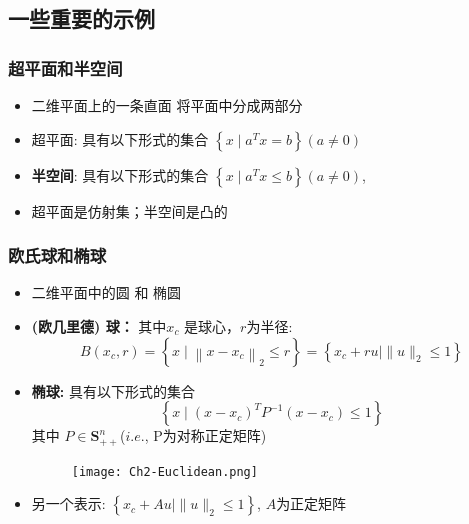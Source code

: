 \documentclass[handout]{beamer}
\begin{document}
\subsection{一些重要的示例}
\begin{frame}
\frametitle{超平面和半空间}

\begin{itemize}%
	\item<1-> 二维平面上的一条直面 将平面中分成两部分 
\item<2->
超平面: 具有以下形式的集合 $\left\{x \mid a^{T} x=b\right\}(a \neq 0)$



\item<2->
\textbf{半空间}: 具有以下形式的集合 $\left\{x \mid a^{T} x \leq b\right\} (a \neq 0)$,



 \item<3-> 超平面是仿射集；半空间是凸的


\end{itemize}

\end{frame}
\begin{frame}
\frametitle{欧氏球和椭球}

\begin{itemize}[<+->]
	\item 二维平面中的圆 和 椭圆 
  \item
\textbf{(欧几里德) 球：} 其中$x_c$ 是球心，$r$为半径:
\begin{equation}
B\left(x_{c}, r\right)=\left\{x \mid\left\|x-x_{c}\right\|_{2} \leq r\right\}=\left\{x_{c}+r u \mid\|u\|_{2} \leq 1\right\}
\end{equation}

\item \textbf{椭球:} 具有以下形式的集合
\begin{equation}
\left\{x \mid\left(x-x_{c}\right)^{T} P^{-1}\left(x-x_{c}\right) \leq 1\right\}
\end{equation}
其中 $P \in \mathbf{S}_{++}^{n}$($i.e.$, P为对称正定矩阵)

  \begin{figure}[htbp]
\centering
\texttt{[image: Ch2-Euclidean.png]}
\end{figure}

\item 另一个表示: $\left\{x_{c}+A u \mid\|u\|_{2} \leq 1\right\}$,  $A$为正定矩阵


\end{itemize}
\end{frame}
\end{document}
